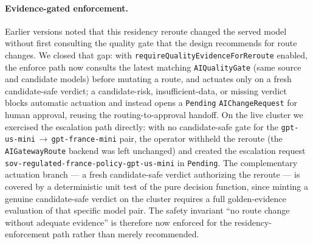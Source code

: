 \paragraph{Evidence-gated enforcement.}
Earlier versions noted that this residency reroute changed the served model without first consulting the quality gate that the design recommends for route changes. We closed that gap: with \texttt{requireQualityEvidenceForReroute} enabled, the enforce path now consults the latest matching \texttt{AIQualityGate} (same source and candidate models) before mutating a route, and actuates only on a fresh candidate-safe verdict; a candidate-risk, insufficient-data, or missing verdict blocks automatic actuation and instead opens a \texttt{Pending} \texttt{AIChangeRequest} for human approval, reusing the routing-to-approval handoff. On the live cluster we exercised the escalation path directly: with no candidate-safe gate for the \texttt{gpt-us-mini}\,$\rightarrow$\,\texttt{gpt-france-mini} pair, the operator withheld the reroute (the \texttt{AIGatewayRoute} backend was left unchanged) and created the escalation request \texttt{sov-regulated-france-policy-gpt-us-mini} in \texttt{Pending}. The complementary actuation branch --- a fresh candidate-safe verdict authorizing the reroute --- is covered by a deterministic unit test of the pure decision function, since minting a genuine candidate-safe verdict on the cluster requires a full golden-evidence evaluation of that specific model pair. The safety invariant ``no route change without adequate evidence'' is therefore now enforced for the residency-enforcement path rather than merely recommended.

